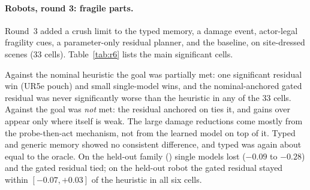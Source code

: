 \paragraph{Robots, round 3: fragile parts.} Round~3 added a crush limit to the typed memory, a damage event,
actor-legal fragility cues, a parameter-only residual planner, and the \pta{} baseline, on site-dressed scenes
(33 cells). Table~\ref{tab:r6} lists the main significant cells.

\begin{table}[!htbp]
  \centering\small
  \caption{Round 3, selected significant cells. Success / damage rate for the two scripted baselines, then
  the change in success for model policies. Single-model results pool three training seeds ($n = 90$);
  residual results use a three-seed ensemble ($n = 30$). Exploratory.}
  \label{tab:r6}
\end{table}

Against the nominal heuristic the goal was partially met: one significant residual win (UR5e pouch) and small
single-model wins, and the nominal-anchored gated residual was never significantly worse than the heuristic in
any of the 33 cells. Against \pta{} the goal was \emph{not} met: the residual anchored on \pta{} ties it, and
gains over \pta{} appear only where \pta{} itself is weak. The large damage reductions come mostly from the
probe-then-act mechanism, not from the learned model on top of it. Typed and generic memory showed no consistent
difference, and typed was again about equal to the oracle. On the held-out family () single
models lost ($-0.09$ to $-0.28$) and the gated residual tied; on the held-out robot the gated residual stayed
within $[-0.07, +0.03]$ of the heuristic in all six cells.


